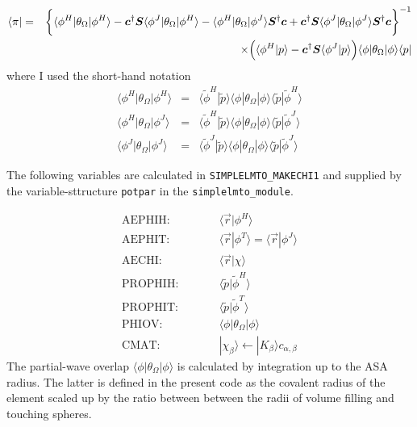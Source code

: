 \documentclass[11pt,a4paper]{report}
\begin{document}
\begin{eqnarray}
\langle\pi|&=& 
\biggl\lbrace
\langle\phi^H|\theta_\Omega|\phi^H\rangle
-\mat{c}^\dagger\mat{S}\langle\phi^J|\theta_\Omega|\phi^H\rangle
-\langle\phi^H|\theta_\Omega|\phi^J\rangle\mat{S}^\dagger\mat{c}
+\mat{c}^\dagger\mat{S}\langle\phi^J|\theta_\Omega
|\phi^J\rangle\mat{S}^\dagger\mat{c}
\biggr\rbrace^{-1}
\nonumber\\
%
&&\times\Bigl(\langle\phi^H|p\rangle
-\mat{c}^\dagger\mat{S}\langle\phi^J|p\rangle\Bigr)
\langle\phi|\theta_\Omega|\phi\rangle
\langle{p}|
\end{eqnarray}
where I used the short-hand notation
\begin{eqnarray}
\langle\phi^H|\theta_\Omega|\phi^H\rangle&=&
\langle\tilde{\phi}^H|\tilde{p}\rangle
\langle\phi|\theta_\Omega|\phi\rangle
\langle\tilde{p}|\tilde{\phi}^H\rangle
 \nonumber\\
%
%
\langle\phi^H|\theta_\Omega|\phi^J\rangle
&=&
\langle\tilde{\phi}^H|\tilde{p}\rangle
\langle\phi|\theta_\Omega|\phi\rangle
\langle\tilde{p}|\tilde{\phi}^J\rangle
\nonumber\\
%
%
\langle\phi^J|\theta_\Omega|\phi^J\rangle
&=&
\langle\tilde{\phi}^J|\tilde{p}\rangle
\langle\phi|\theta_\Omega|\phi\rangle
\langle\tilde{p}|\tilde{\phi}^J\rangle
\end{eqnarray}


The following variables are calculated in \verb|SIMPLELMTO_MAKECHI1|
and supplied by the variable-sttructure \verb|potpar| in the
\verb|simplelmto_module|.

\begin{eqnarray}
\text{AEPHIH:}\qquad&&   \langle\vec{r}|\phi^H\rangle
\nonumber\\
\text{AEPHIT:}\qquad &&  \langle\vec{r}|\phi^T\rangle
=\langle\vec{r}|\phi^J\rangle
\nonumber\\
\text{AECHI:}\qquad&&   \langle\vec{r}|\chi\rangle
\nonumber\\
\text{PROPHIH:}\qquad&&   \langle\tilde{p}|\tilde{\phi}^H\rangle
\nonumber\\
\text{PROPHIT:}\qquad&&   \langle\tilde{p}|\tilde{\phi}^T\rangle
\nonumber\\
\text{PHIOV:}\qquad&&   \langle\phi|\theta_\Omega|\phi\rangle
\nonumber\\
\text{CMAT:}\qquad&&    |\chi_\beta\rangle
\leftarrow |K_\beta\rangle c_{\alpha,\beta}
\end{eqnarray}
The partial-wave overlap $\langle\phi|\theta_\Omega|\phi\rangle$ is
calculated by integration up to the ASA radius. The latter is defined
in the present code as the covalent radius of the element scaled up by
the ratio between between the radii of volume filling and touching 
spheres.
\end{document}
